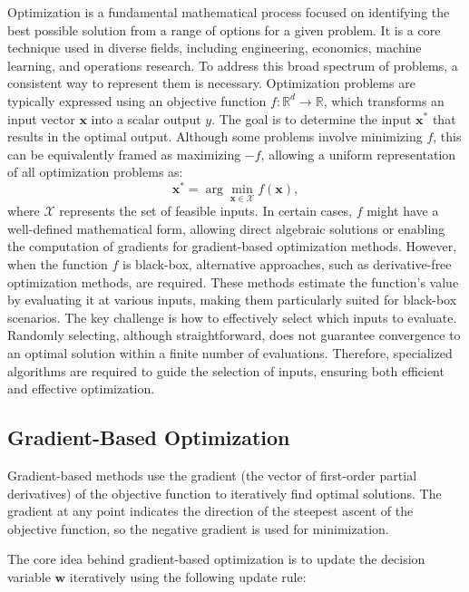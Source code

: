 Optimization is a fundamental mathematical process focused on identifying the best possible solution from a range of options for a given problem. It is a core technique used in diverse fields, including engineering, economics, machine learning, and operations research. To address this broad spectrum of problems, a consistent way to represent them is necessary. Optimization problems are typically expressed using an objective function \( f \colon \mathbb{R}^d \rightarrow \mathbb{R} \), which transforms an input vector \( \mathbf{x} \) into a scalar output \( y \). The goal is to determine the input \( \mathbf{x}^* \) that results in the optimal output. Although some problems involve minimizing \( f \), this can be equivalently framed as maximizing \( -f \), allowing a uniform representation of all optimization problems as:
\[
\mathbf{x}^* = \arg \min_{\mathbf{x} \in \mathcal{X}} f(\mathbf{x}),
\]
where \( \mathcal{X} \) represents the set of feasible inputs. In certain cases, 
$f$ might have a well-defined mathematical form, allowing direct algebraic solutions or enabling the computation of gradients for gradient-based optimization methods. However, when the function $f$ is black-box, alternative approaches, such as derivative-free optimization methods, are required. These methods estimate the function's value by evaluating it at various inputs, making them particularly suited for black-box scenarios. The key challenge is how to effectively select which inputs to evaluate. Randomly selecting, although straightforward, does not guarantee convergence to an optimal solution within a finite number of evaluations. Therefore, specialized algorithms are required to guide the selection of inputs, ensuring both efficient and effective optimization.


\subsection{Gradient-Based Optimization}
\label{subsection:gradient_based_optimization}

\noindent Gradient-based methods use the gradient (the vector of first-order partial derivatives) of the objective function to iteratively find optimal solutions. The gradient at any point indicates the direction of the steepest ascent of the objective function, so the negative gradient is used for minimization.

The core idea behind gradient-based optimization is to update the decision variable $\mathbf{w}$ iteratively using the following update rule:

